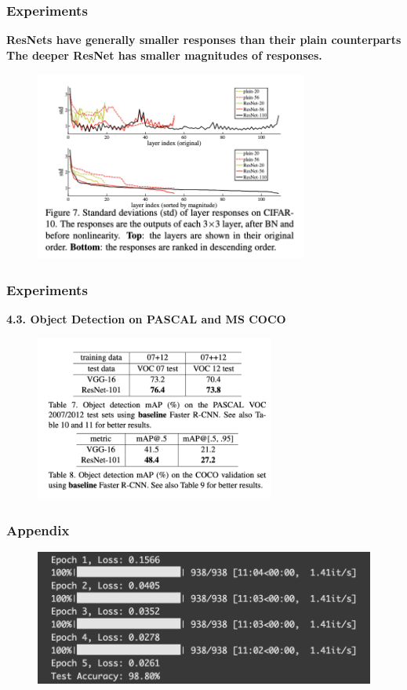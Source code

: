 \documentclass[
	11pt, %
]{beamer}
\begin{document}
\begin{frame}
	\frametitle{Experiments}

	\textbf{ResNets have generally smaller responses than their plain counterparts}\\
	\textbf{The deeper ResNet has smaller magnitudes of responses.}

	\begin{figure}
		\centering
		\includegraphics[width=0.8\textwidth]{./images/Screenshot 2025-05-20 at 0.42.53.png}
	\end{figure}
\end{frame}

\begin{frame}
	\frametitle{Experiments}

	\textbf{4.3. Object Detection on PASCAL and MS COCO} 

	\begin{figure}
		\centering
		\includegraphics[width=0.7\textwidth]{./images/Screenshot 2025-05-20 at 0.44.13.png}
	\end{figure}
\end{frame}

\begin{frame}
	\frametitle{Appendix}

	\begin{figure}
		\centering
		\includegraphics[width=\textwidth]{./images/Screenshot 2025-05-20 at 9.51.40.png}
	\end{figure}
\end{frame}
\end{document}
